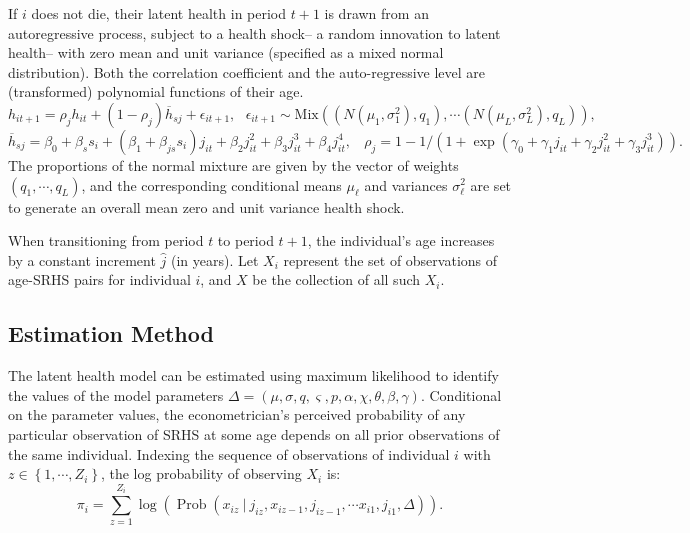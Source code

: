 \documentclass[12pt,pdftex,letterpaper]{article}
\newcommand{\Prob}{\operatorname{Prob}}
\newcommand{\Health}{h}
\newcommand{\ExpHealth}{\overline{\Health}}
\newcommand{\Report}{x}
\newcommand{\Age}{j}
\newcommand{\Sex}{s}
\newcommand{\AgeIncr}{\hat{\Age}}
\newcommand{\Corr}{\rho}
\newcommand{\Cut}{\chi}
\newcommand{\MortParam}{\theta}
\newcommand{\CorrParam}{\gamma}
\newcommand{\HealthParam}{\beta}
\newcommand{\LatentParam}{\alpha}
\newcommand{\HealthShock}{\epsilon}
\newcommand{\ShockMean}{\mu}
\newcommand{\ShockStd}{\sigma}
\newcommand{\MixProb}{q}
\newcommand{\TypeProb}{p}
\newcommand{\ReportStd}{\varsigma}
\newcommand{\Data}{X}
\newcommand{\ParamVec}{\Delta}
\newcommand{\LL}{\pi}
\begin{document}
If $i$ does not die, their latent health in period $t+1$ is drawn from an autoregressive process, subject to a health shock-- a random innovation to latent health-- with zero mean and unit variance (specified as a mixed normal distribution). Both the correlation coefficient and the auto-regressive level are (transformed) polynomial functions of their age.
\begin{equation}\label{HealthNext}
\Health_{it+1} = \Corr_{\Age} \Health_{it} + (1-\Corr_{\Age}) \ExpHealth_{\Sex\Age} + \HealthShock_{it+1}, ~~~ \HealthShock_{it+1} \sim \text{Mix}((N(\ShockMean_1,\ShockStd_1^2),\MixProb_1), \cdots (N(\ShockMean_L,\ShockStd_L^2),\MixProb_L)),
\end{equation}
\begin{equation*}
\ExpHealth_{\Sex\Age} = \HealthParam_0 + \HealthParam_\Sex \Sex_i + (\HealthParam_1 + \HealthParam_{\Age\Sex} \Sex_i) \Age_{it} + \HealthParam_2 \Age_{it}^2 + \HealthParam_3 \Age_{it}^3 + \HealthParam_4 \Age_{it}^4, ~~~~ \Corr_{\Age} = 1 - 1 \big/ (1 + \exp(\CorrParam_0 + \CorrParam_1 \Age_{it} + \CorrParam_2 \Age_{it}^2 + \CorrParam_3 \Age_{it}^3)).
\end{equation*}
The proportions of the normal mixture are given by the vector of weights $(\MixProb_1,\cdots,\MixProb_L)$, and the corresponding conditional means $\ShockMean_\ell$ and variances $\ShockStd_\ell^2$ are set to generate an overall mean zero and unit variance health shock.

When transitioning from period $t$ to period $t+1$, the individual's age increases by a constant increment $\AgeIncr$ (in years). Let $\Data_i$ represent the set of observations of age-SRHS pairs for individual $i$, and $\Data$ be the collection of all such $\Data_i$.


\subsection{Estimation Method}\label{sec:Estimation}

The latent health model can be estimated using maximum likelihood to identify the values of the model parameters $\ParamVec = (\ShockMean,\ShockStd,\MixProb,\ReportStd,\TypeProb,\LatentParam,\Cut,\MortParam,\HealthParam,\CorrParam)$. Conditional on the parameter values, the econometrician's perceived probability of any particular observation of SRHS at some age depends on all prior observations of the same individual. Indexing the sequence of observations of individual $i$ with $z \in \left\{1,\cdots,Z_i\right\}$, the log probability of observing $\Data_i$ is:
\begin{equation}
\LL_i = \sum_{z=1}^{Z_i} \log \left( \Prob \left(\Report_{iz} ~\big|~ \Age_{iz}, \Report_{iz-1}, \Age_{iz-1},\cdots \Report_{i1},\Age_{i1}, \Delta \right) \right) .
\end{equation}
\end{document}
